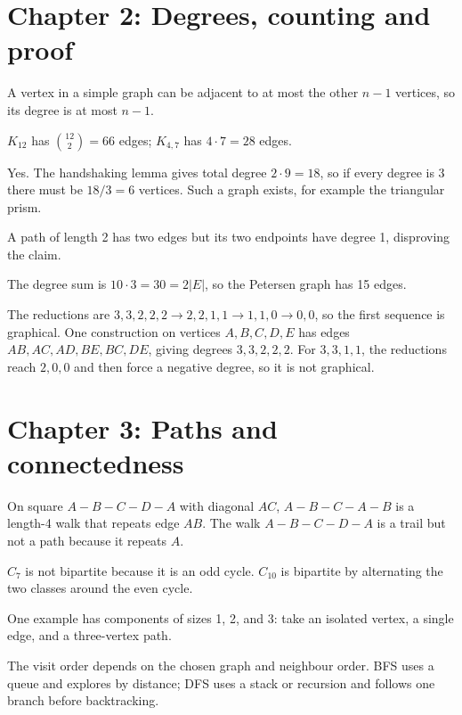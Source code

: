 \section*{Chapter 2: Degrees, counting and proof}
\begin{description}[style=nextline]
\item[2.1] A vertex in a simple graph can be adjacent to at most the other $n-1$ vertices, so its degree is at most $n-1$.
\item[2.2] $K_{12}$ has $\binom{12}{2}=66$ edges; $K_{4,7}$ has $4\cdot7=28$ edges.
\item[2.3] Yes. The handshaking lemma gives total degree $2\cdot9=18$, so if every degree is 3 there must be $18/3=6$ vertices. Such a graph exists, for example the triangular prism.
\item[2.4] A path of length 2 has two edges but its two endpoints have degree 1, disproving the claim.
\item[2.5] The degree sum is $10\cdot3=30=2|E|$, so the Petersen graph has 15 edges.
\item[2.6] The reductions are $3,3,2,2,2\to2,2,1,1\to1,1,0\to0,0$, so the first sequence is graphical. One construction on vertices $A,B,C,D,E$ has edges $AB,AC,AD,BE,BC,DE$, giving degrees $3,3,2,2,2$. For $3,3,1,1$, the reductions reach $2,0,0$ and then force a negative degree, so it is not graphical.
\end{description}

\section*{Chapter 3: Paths and connectedness}
\begin{description}[style=nextline]
\item[3.1] On square $A-B-C-D-A$ with diagonal $AC$, $A-B-C-A-B$ is a length-4 walk that repeats edge $AB$. The walk $A-B-C-D-A$ is a trail but not a path because it repeats $A$.
\item[3.2] $C_7$ is not bipartite because it is an odd cycle. $C_{10}$ is bipartite by alternating the two classes around the even cycle.
\item[3.3] One example has components of sizes 1, 2, and 3: take an isolated vertex, a single edge, and a three-vertex path.
\item[3.4] The visit order depends on the chosen graph and neighbour order. BFS uses a queue and explores by distance; DFS uses a stack or recursion and follows one branch before backtracking.
\end{description}

